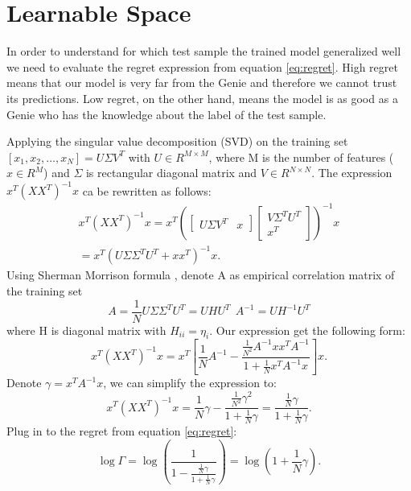 \documentclass[conference,letterpaper]{IEEEtran}
\begin{document}
\section{Learnable Space} \label{sec:learnable_space}
In order to understand for which test sample the trained model generalized well we need to evaluate the regret expression from equation \ref{eq:regret}. High regret means that our model is very far from the Genie and therefore we cannot trust its predictions. Low regret, on the other hand, means the model is as good as a Genie who has the knowledge about the label of the test sample.

Applying the singular value decomposition (SVD) on the training set $[x_1,x_2, \hdots, x_{N}] = U \Sigma V^T$ with $U\in R^{M \times M}$, where M is the number of features ($x \in R^M$) and $\Sigma$ is rectangular diagonal matrix and $V \in R^{N \times N}$. The expression $x^T(XX^T)^{-1}x$ ca be rewritten as follows:
\begin{multline}
x^T(XX^T)^{-1}x = 
x^T\left(\begin{bmatrix} U \Sigma V^T & x \end{bmatrix}
\begin{bmatrix}
V \Sigma^T U^T \\ x^T
\end{bmatrix}
\right)^{-1}x \\
=  x^T\left(U \Sigma \Sigma^T U^T + x x^T\right)^{-1}x.
\end{multline}
Using Sherman Morrison formula \cite{press2007section}, denote A as empirical correlation matrix of the training set 
\begin{equation}
A=\frac{1}{N} U \Sigma \Sigma^T U^T=U H U^T \ \ A^{-1}=  U H^{-1} U^T   
\end{equation}
where H is diagonal matrix with $H_{ii}=\eta_i$.
Our expression get the following form:
\begin{equation}
x^T(XX^T)^{-1}x = 
x^T \left[ \frac{1}{N}A^{-1} -  \frac{\frac{1}{N^2}A^{-1} x x^T  A^{-1}}{1 + \frac{1}{N} x^T  A^{-1} x} \right] x.
\end{equation}
Denote $\gamma = x^T A^{-1} x$, we can simplify the expression to:
\begin{equation}
x^T(XX^T)^{-1}x = \frac{1}{N}\gamma - \frac{\frac{1}{N^2}\gamma^2}{1+\frac{1}{N}\gamma} = \frac{\frac{1}{N}\gamma}{1+\frac{1}{N}\gamma}.
\end{equation}
Plug in to the regret from equation \ref{eq:regret}:
\begin{equation}
\log \Gamma = \log \left( \frac{1}{1-\frac{\frac{1}{N}\gamma}{1+\frac{1}{N}\gamma}} \right)
=  \log \left( 1+\frac{1}{N} \gamma \right).
\end{equation}
\end{document}
